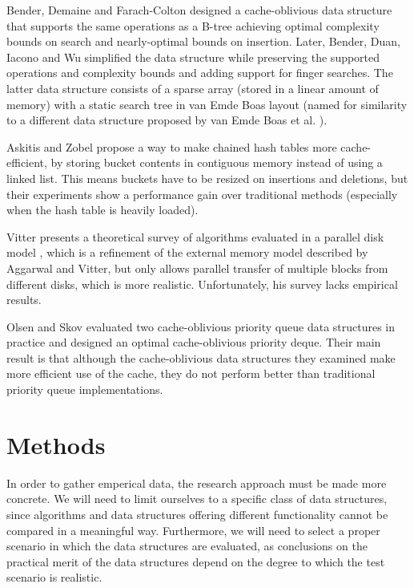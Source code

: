 \documentclass{acm_proc_article-sp}
\begin{document}
Bender, Demaine and Farach-Colton designed a cache-oblivious data structure that supports the same operations as a B-tree \cite{bender2005cob} achieving optimal complexity bounds on search and nearly-optimal bounds on insertion. Later, Bender, Duan, Iacono and Wu simplified the data structure \cite{bender2004lpc} while preserving the supported operations and complexity bounds and adding support for finger searches. The latter data structure consists of a sparse array (stored in a linear amount of memory) with a static search tree in van Emde Boas layout (named for similarity to a different data structure proposed by van Emde Boas et al. \cite{vanemdeboas1976dai}).

Askitis and Zobel \cite{askitis2005ccc} propose a way to make chained hash tables more cache-efficient, by storing bucket contents in contiguous memory instead of using a linked list. This means buckets have to be resized on insertions and deletions, but their experiments show a performance gain over traditional methods (especially when the hash table is heavily loaded).

Vitter presents a theoretical survey of algorithms evaluated in a parallel disk model \cite{vitter2001ema}, which is a refinement of the external memory model described by Aggarwal and Vitter, but only allows parallel transfer of multiple blocks from different disks, which is more realistic. Unfortunately, his survey lacks empirical results.

Olsen and Skov evaluated two cache-oblivious priority queue data structures in practice \cite{olsen2002coa} and designed an optimal cache-obli\-vious priority deque. Their main result is that although the cache-obli\-vious data structures they examined make more efficient use of the cache, they do not perform better than traditional priority queue implementations.


\section{Methods}
In order to gather emperical data, the research approach must be made more concrete. We will need to limit ourselves to a specific class of data structures, since algorithms and data structures offering different functionality cannot be compared in a meaningful way. Furthermore, we will need to select a proper scenario in which the data structures are evaluated, as conclusions on the practical merit of the data structures depend on the degree to which the test scenario is realistic.
\end{document}
